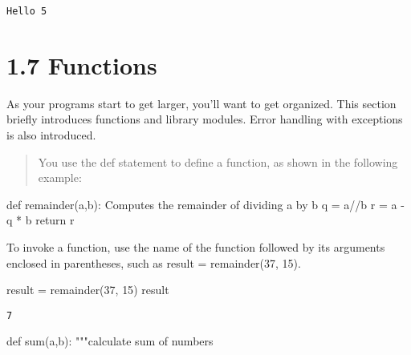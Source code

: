 \documentclass[
  letterpaper,
  DIV=11,
  numbers=noendperiod]{scrreprt}
\newenvironment{Shaded}{\begin{snugshade}}{\end{snugshade}}
\newcommand{\BuiltInTok}[1]{\textcolor[rgb]{0.00,0.46,0.62}{#1}}
\newcommand{\BuiltInTok}[1]{\textcolor[rgb]{0.00,0.48,0.65}{#1}}
\newcommand{\CommentTok}[1]{\textcolor[rgb]{0.37,0.37,0.37}{#1}}
\newcommand{\ControlFlowTok}[1]{\textcolor[rgb]{0.00,0.46,0.62}{#1}}
\newcommand{\ControlFlowTok}[1]{\textcolor[rgb]{0.00,0.48,0.65}{#1}}
\newcommand{\DecValTok}[1]{\textcolor[rgb]{0.68,0.00,0.00}{#1}}
\newcommand{\KeywordTok}[1]{\textcolor[rgb]{0.00,0.46,0.62}{#1}}
\newcommand{\NormalTok}[1]{\textcolor[rgb]{0.00,0.46,0.62}{#1}}
\newcommand{\OperatorTok}[1]{\textcolor[rgb]{0.37,0.37,0.37}{#1}}
\newcommand{\KeywordTok}[1]{\textcolor[rgb]{0.00,0.48,0.65}{#1}}
\newcommand{\NormalTok}[1]{\textcolor[rgb]{0.00,0.48,0.65}{#1}}
\newcommand{\OperatorTok}[1]{\textcolor[rgb]{0.37,0.37,0.37}{#1}}
\begin{document}
\begin{Shaded}
\begin{Highlighting}[]
\begin{verbatim}
Hello 5
\end{verbatim}

\hypertarget{functions}{%
\section{1.7 Functions}\label{functions}}

As your programs start to get larger, you'll want to get organized. This
section briefly introduces functions and library modules. Error handling
with exceptions is also introduced.

\begin{quote}
You use the def statement to define a function, as shown in the
following example:
\end{quote}

\begin{Shaded}
\begin{Highlighting}[]
\KeywordTok{def}\NormalTok{ remainder(a,b):     }
    \CommentTok{\textquotesingle{}\textquotesingle{}\textquotesingle{}  }
\CommentTok{    Computes    the remainder   of  dividing    a   by  b               }
\CommentTok{    \textquotesingle{}\textquotesingle{}\textquotesingle{}}                 
\NormalTok{    q   }\OperatorTok{=}\NormalTok{   a}\OperatorTok{//}\NormalTok{b}
\NormalTok{    r   }\OperatorTok{=}\NormalTok{   a }\OperatorTok{{-}}\NormalTok{ q }\OperatorTok{*}\NormalTok{ b }
    \ControlFlowTok{return}\NormalTok{  r}
\end{Highlighting}
\end{Shaded}

To invoke a function, use the name of the function followed by its
arguments enclosed in parentheses, such as result = remainder(37, 15).

\begin{Shaded}
\begin{Highlighting}[]
\NormalTok{result }\OperatorTok{=}\NormalTok{ remainder(}\DecValTok{37}\NormalTok{, }\DecValTok{15}\NormalTok{)}
\NormalTok{result}
\end{Highlighting}
\end{Shaded}

\begin{verbatim}
7
\end{verbatim}

\begin{Shaded}
\begin{Highlighting}[]
\KeywordTok{def} \BuiltInTok{sum}\NormalTok{(a,b):}
    \CommentTok{"""calculate sum of numbers}


\end{Highlighting}
\end{Shaded}
\end{Highlighting}
\end{Shaded}
\end{document}
